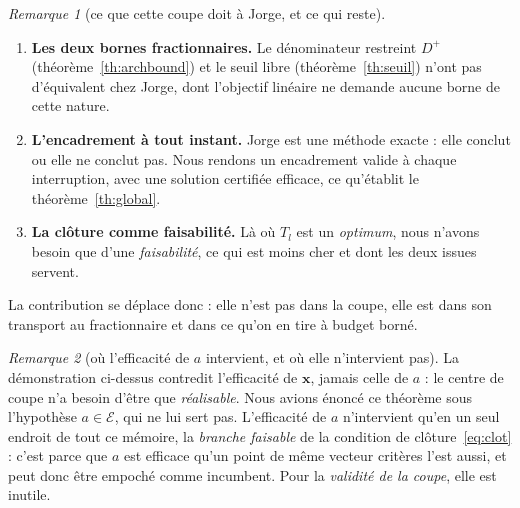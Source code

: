 \documentclass[11pt,a4paper]{article}
\theoremstyle{plain}
\theoremstyle{remark}
\newtheorem{remark}{Remarque}
\newcommand{\Zk}{Z_k}
\newcommand{\Nk}{N_k}
\newcommand{\Dk}{D_k}
\newcommand{\Ecal}{\mathcal{E}}
\begin{document}
\begin{remark}[ce que cette coupe doit à Jorge, et ce qui reste]
\begin{enumerate}[label=(\alph*),leftmargin=2.2em]
  Cette exigence non plus n'est pas neuve, et il faut le dire. Sylva et
  Crema~\cite{sylva2004} la posent explicitement -- leur pas d'amélioration
  minimal vaut $1$ \emph{si la matrice de coûts est entière} -- et
  l'étendent aux coûts \textbf{rationnels} par
  $f_k=1/\operatorname{lcm}\{r_{kj}\}$ lorsque $c_{kj}=q_{kj}/r_{kj}$. Ce
  qui reste propre au fractionnaire est que ce procédé n'y suffit pas : un
  multiple commun traite des coefficients rationnels dans une forme
  \emph{affine}, où les dénominateurs sont des \emph{constantes}. Nos
  critères sont des \emph{quotients} $\Zk=\Nk/\Dk$, dont le dénominateur
  varie avec $x$ ; il n'y a pas de dénominateur à multiplier. La
  multiplication croisée $e^a_k=\bar D_k\Nk(x)-\bar N_k\Dk(x)$ est une
  autre opération : elle remplace le quotient par une \emph{différence
  affine} en utilisant le dénominateur du \emph{centre}, et c'est ce
  remplacement qui rend la forme entière. Le test d'efficacité
  fractionnaire de~\cite{chaiblaine2020} porte d'ailleurs des coefficients
  rationnels, là où le nôtre est entier par construction.
\item \textbf{Les deux bornes fractionnaires.} Le dénominateur restreint
  $D^{+}$ (théorème~\ref{th:archbound}) et le seuil libre
  (théorème~\ref{th:seuil}) n'ont pas d'équivalent chez Jorge, dont
  l'objectif linéaire ne demande aucune borne de cette nature.
\item \textbf{L'encadrement à tout instant.} Jorge est une méthode exacte :
  elle conclut ou elle ne conclut pas. Nous rendons un encadrement valide à
  chaque interruption, avec une solution certifiée efficace, ce
  qu'établit le théorème~\ref{th:global}.
\item \textbf{La clôture comme faisabilité.} Là où $T_l$ est un
  \emph{optimum}, nous n'avons besoin que d'une \emph{faisabilité}, ce qui
  est moins cher et dont les deux issues servent.
\end{enumerate}
La contribution se déplace donc : elle n'est pas dans la coupe, elle est
dans son transport au fractionnaire et dans ce qu'on en tire à budget
borné.
\end{remark}

\begin{remark}[où l'efficacité de $a$ intervient, et où elle
n'intervient pas]\label{rem:aeff}
La démonstration ci-dessus contredit l'efficacité de $\mathbf{x}$, jamais
celle de $a$ : le centre de coupe n'a besoin d'être que \emph{réalisable}.
Nous avions énoncé ce théorème sous l'hypothèse $a\in\Ecal$, qui ne
lui sert pas. L'efficacité de $a$ n'intervient qu'en un seul endroit de tout
ce mémoire, la \emph{branche faisable} de la condition de
clôture~\eqref{eq:clot} : c'est parce que $a$ est efficace qu'un point de
même vecteur critères l'est aussi, et peut donc être empoché comme
incumbent. Pour la \emph{validité de la coupe}, elle est inutile.
\end{remark}
\end{document}
